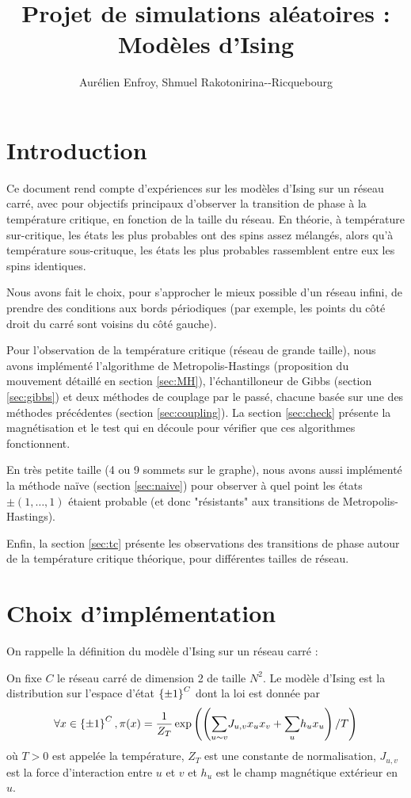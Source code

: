 \documentclass[a4paper,11pt]{article}
\title{Projet de simulations aléatoires : Modèles d'Ising}
\author{Aurélien Enfroy, Shmuel Rakotonirina{-}-Ricquebourg}
\begin{document}
\maketitle
\tableofcontents

\section{Introduction}

Ce document rend compte d'expériences sur les modèles d'Ising sur un réseau carré, avec pour objectifs principaux d'observer la transition de phase à la température critique, en fonction de la taille du réseau. En théorie, à température sur-critique, les états les plus probables ont des spins assez mélangés, alors qu'à température sous-crituque, les états les plus probables rassemblent entre eux les spins identiques.

Nous avons fait le choix, pour s'approcher le mieux possible d'un réseau infini, de prendre des conditions aux bords périodiques (par exemple, les points du côté droit du carré sont voisins du côté gauche).

Pour l'observation de la température critique (réseau de grande taille), nous avons implémenté l'algorithme de Metropolis-Hastings (proposition du mouvement détaillé en section \ref{sec:MH}), l'échantilloneur de Gibbs (section \ref{sec:gibbs}) et deux méthodes de couplage par le passé, chacune basée sur une des méthodes précédentes (section \ref{sec:coupling}). La section \ref{sec:check} présente la magnétisation et le test qui en découle pour vérifier que ces algorithmes fonctionnent.

En très petite taille (4 ou 9 sommets sur le graphe), nous avons aussi implémenté la méthode naïve (section \ref{sec:naive}) pour observer à quel point les états $\pm(1,\hdots,1)$ étaient probable (et donc "résistants" aux transitions de Metropolis-Hastings).

Enfin, la section \ref{sec:tc} présente les observations des transitions de phase autour de la température critique théorique, pour différentes tailles de réseau.

\section{Choix d'implémentation}\label{sec:implementation}

On rappelle la définition du modèle d'Ising sur un réseau carré :
\begin{definition}
On fixe $C$ le réseau carré de dimension 2 de taille $N^2$. Le modèle d'Ising est la distribution sur l'espace d'état $\left\lbrace \pm 1 \right\rbrace^C$ dont la loi est donnée par
$$\forall x \in \left\lbrace \pm 1 \right\rbrace^C, \pi(x) = \frac{1}{Z_T} \exp \left(\left( \displaystyle{\sum_{u\sim v}^{}} J_{u,v} x_{u} x_{v} + \displaystyle{\sum_{u}^{}} h_{u} x_{u} \right)/T\right)$$
où $T>0$ est appelée la température, $Z_T$ est une constante de normalisation, $J_{u,v}$ est la force d'interaction entre $u$ et $v$ et $h_{u}$ est le champ magnétique extérieur en $u$.
\end{definition}
\end{document}
